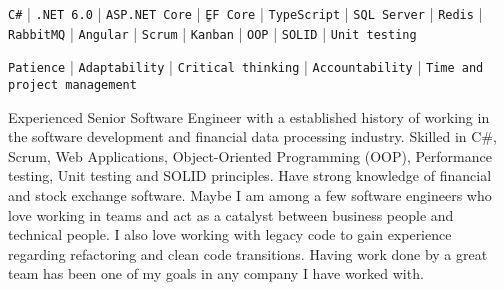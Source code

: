 \documentclass[9pt]{developercv} %
\begin{document}
\vspace{0.0cm}




\begin{minipage}[t]{1\textwidth} %
	\vspace{-\baselineskip} %
\texttt{C\#} | \texttt{.NET 6.0} | \texttt{ASP.NET Core} | \texttt{ٍEF Core} | \texttt{TypeScript} | \texttt{SQL Server} | \texttt{Redis} | \texttt{RabbitMQ} | \texttt{Angular} | \texttt{Scrum} | \texttt{Kanban} | \texttt{OOP} | \texttt{SOLID} | \texttt{Unit testing}
\end{minipage}


\begin{minipage}[t]{1\textwidth} %
	\vspace{-\baselineskip} %
\texttt{Patience} | \texttt{Adaptability} | \texttt{Critical thinking} | \texttt{Accountability} | \texttt{Time and project management}
\end{minipage}



\begin{minipage}[t]{1\textwidth} %
	\vspace{-\baselineskip} %
	
Experienced Senior Software Engineer with a established history of working in the software development and financial data processing industry. Skilled in C\#, Scrum, Web Applications, Object-Oriented Programming (OOP), Performance testing, Unit testing and SOLID principles. Have strong knowledge of financial and stock exchange software. Maybe I am among a few software engineers who love working in teams and act as a catalyst between business people and technical people. I also love working with legacy code to gain experience regarding refactoring and clean code transitions. Having work done by a great team has been one of my goals in any company I have worked with.
\end{minipage}
\end{document}
